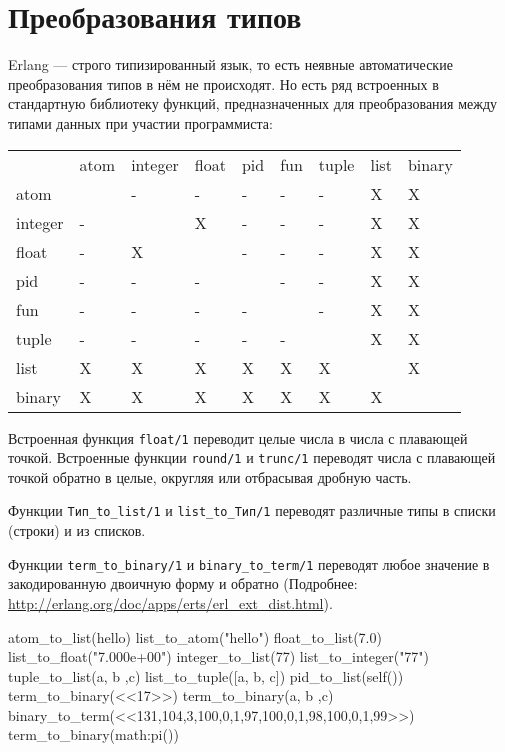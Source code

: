 \section{Преобразования типов}

Erlang --- строго типизированный язык, то есть неявные автоматические 
преобразования типов в нём не происходят. Но есть ряд встроенных в стандартную
библиотеку функций, предназначенных для преобразования между типами данных
при участии программиста:

\begin{center}
\begin{tabular}{|>{\raggedright}p{63pt}|>{\raggedright}p{30pt}|>{\raggedright}p{35pt}|>{\raggedright}p{21pt}|>{\raggedright}p{21pt}|>{\raggedright}p{21pt}|>{\raggedright}p{30pt}|>{\raggedright}p{21pt}|>{\raggedright}p{35pt}|}
\hline
\multicolumn{9}{|p{243pt}|}{Преобразования типов}\tabularnewline
\hline
 & atom & integer & float & pid & fun & tuple & list & binary\tabularnewline
\hline
atom &  & - & - & - & - & - & X & X\tabularnewline
\hline
integer & - &  & X & - & - & - & X & X\tabularnewline
\hline
float & - & X &  & - & - & - & X & X\tabularnewline
\hline
pid & - & - & - &  & - & - & X & X\tabularnewline
\hline
fun & - & - & - & - &  & - & X & X\tabularnewline
\hline
tuple & - & - & - & - & - &  & X & X\tabularnewline
\hline
list & X & X & X & X & X & X &  & X\tabularnewline
\hline
binary & X & X & X & X & X & X & X & \tabularnewline
\hline
\end{tabular}
\end{center}

Встроенная функция \texttt{float/1} переводит целые числа в числа с 
плавающей точкой. Встроенные функции \texttt{round/1} и \texttt{trunc/1}
переводят числа с плавающей точкой обратно в целые, округляя или отбрасывая
дробную часть.

Функции \texttt{Тип\_to\_list/1} и \texttt{list\_to\_Тип/1}
переводят различные типы в списки (строки) и из списков.

Функции \texttt{term\_to\_binary/1} и \texttt{binary\_to\_term/1} переводят 
любое значение в закодированную двоичную форму и обратно (Подробнее: 
\url{http://erlang.org/doc/apps/erts/erl_ext_dist.html}).

\begin{erlang}
atom_to_list(hello)        %
list_to_atom("hello")      %
float_to_list(7.0)         %
list_to_float("7.000e+00") %
integer_to_list(77)        %
list_to_integer("77")      %
tuple_to_list({a, b ,c})   %
list_to_tuple([a, b, c])   %
pid_to_list(self())        %
term_to_binary(<<17>>)     %
term_to_binary({a, b ,c})  %
binary_to_term(<<131,104,3,100,0,1,97,100,0,1,98,100,0,1,99>>) 
term_to_binary(math:pi())  %
\end{erlang}
                           
